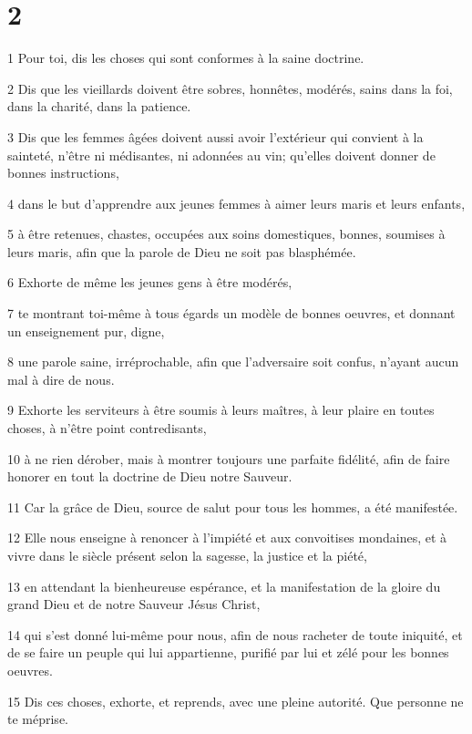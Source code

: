 \chapter{2}

\par 1 Pour toi, dis les choses qui sont conformes à la saine doctrine.
\par 2 Dis que les vieillards doivent être sobres, honnêtes, modérés, sains dans la foi, dans la charité, dans la patience.
\par 3 Dis que les femmes âgées doivent aussi avoir l'extérieur qui convient à la sainteté, n'être ni médisantes, ni adonnées au vin; qu'elles doivent donner de bonnes instructions,
\par 4 dans le but d'apprendre aux jeunes femmes à aimer leurs maris et leurs enfants,
\par 5 à être retenues, chastes, occupées aux soins domestiques, bonnes, soumises à leurs maris, afin que la parole de Dieu ne soit pas blasphémée.
\par 6 Exhorte de même les jeunes gens à être modérés,
\par 7 te montrant toi-même à tous égards un modèle de bonnes oeuvres, et donnant un enseignement pur, digne,
\par 8 une parole saine, irréprochable, afin que l'adversaire soit confus, n'ayant aucun mal à dire de nous.
\par 9 Exhorte les serviteurs à être soumis à leurs maîtres, à leur plaire en toutes choses, à n'être point contredisants,
\par 10 à ne rien dérober, mais à montrer toujours une parfaite fidélité, afin de faire honorer en tout la doctrine de Dieu notre Sauveur.
\par 11 Car la grâce de Dieu, source de salut pour tous les hommes, a été manifestée.
\par 12 Elle nous enseigne à renoncer à l'impiété et aux convoitises mondaines, et à vivre dans le siècle présent selon la sagesse, la justice et la piété,
\par 13 en attendant la bienheureuse espérance, et la manifestation de la gloire du grand Dieu et de notre Sauveur Jésus Christ,
\par 14 qui s'est donné lui-même pour nous, afin de nous racheter de toute iniquité, et de se faire un peuple qui lui appartienne, purifié par lui et zélé pour les bonnes oeuvres.
\par 15 Dis ces choses, exhorte, et reprends, avec une pleine autorité. Que personne ne te méprise.

